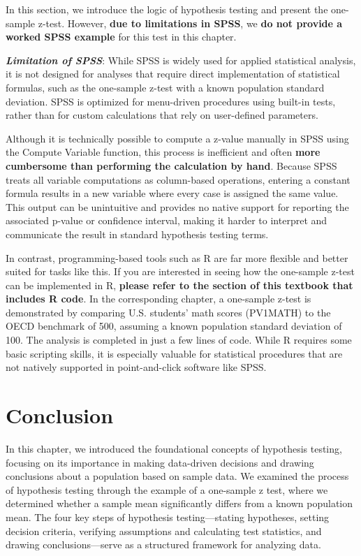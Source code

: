 \documentclass[
  letterpaper,
  DIV=11,
  numbers=noendperiod]{scrreprt}
\begin{document}
In this section, we introduce the logic of hypothesis testing and
present the one-sample z-test. However, \textbf{due to limitations in
SPSS}, we \textbf{do not provide a worked SPSS example} for this test in
this chapter.

\textbf{\emph{Limitation of SPSS}}: While SPSS is widely used for
applied statistical analysis, it is not designed for analyses that
require direct implementation of statistical formulas, such as the
one-sample z-test with a known population standard deviation. SPSS is
optimized for menu-driven procedures using built-in tests, rather than
for custom calculations that rely on user-defined parameters.

Although it is technically possible to compute a z-value manually in
SPSS using the Compute Variable function, this process is inefficient
and often \textbf{more cumbersome than performing the calculation by
hand}. Because SPSS treats all variable computations as column-based
operations, entering a constant formula results in a new variable where
every case is assigned the same value. This output can be unintuitive
and provides no native support for reporting the associated p-value or
confidence interval, making it harder to interpret and communicate the
result in standard hypothesis testing terms.

In contrast, programming-based tools such as R are far more flexible and
better suited for tasks like this. If you are interested in seeing how
the one-sample z-test can be implemented in R, \textbf{please refer to
the section of this textbook that includes R code}. In the corresponding
chapter, a one-sample z-test is demonstrated by comparing U.S. students'
math scores (PV1MATH) to the OECD benchmark of 500, assuming a known
population standard deviation of 100. The analysis is completed in just
a few lines of code. While R requires some basic scripting skills, it is
especially valuable for statistical procedures that are not natively
supported in point-and-click software like SPSS.


\chapter*{Conclusion}\label{conclusion-6}


In this chapter, we introduced the foundational concepts of hypothesis
testing, focusing on its importance in making data-driven decisions and
drawing conclusions about a population based on sample data. We examined
the process of hypothesis testing through the example of a one-sample z
test, where we determined whether a sample mean significantly differs
from a known population mean. The four key steps of hypothesis
testing---stating hypotheses, setting decision criteria, verifying
assumptions and calculating test statistics, and drawing
conclusions---serve as a structured framework for analyzing data.
\end{document}
